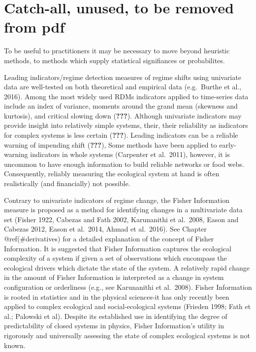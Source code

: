 \documentclass[12pt,twoside,openany]{reedthesis}
\begin{document}
\hypertarget{catch-all-unused-to-be-removed-from-pdf}{%
\chapter*{Catch-all, unused, to be removed from pdf}\label{catch-all-unused-to-be-removed-from-pdf}}

To be useful to practitioners it may be necessary to move beyond heuristic methods, to methods which supply statistical signifiances or probabilites.

Leading indicators/regime detection measures of regime shifts using univariate data are well-tested on both theoretical and empirical data (e.g.~Burthe et al., 2016). Among the most widely used RDMs indicators applied to time-series data include an index of variance, moments around the grand mean (skewness and kurtosis), and critical slowing down ({\textbf{???}}). Although univariate indicators may provide insight into relatively simple systems, their, their reliability as indicators for complex systems is less certain ({\textbf{???}}). Leading indicators can be a reliable warning of impending shift ({\textbf{???}}), Some methods have been applied to early-warning indicators in whole systems (Carpenter et al.~2011), however, it is uncommon to have enough information to build reliable networks or food webs. Consequently, reliably measuring the ecological system at hand is often realistically (and financially) not possible.

Contrary to univariate indicators of regime change, the Fisher Information measure is proposed as a method for identifying changes in a multivariate data set (Fisher 1922, Cabezas and Fath 2002, Karunanithi et al.~2008, Eason and Cabezas 2012, Eason et al.~2014, Ahmad et al.~2016). See Chapter @ref(\#derivatives) for a detailed explanation of the concept of Fisher Information. It is suggested that Fisher Information captures the ecological complexity of a system if given a set of observations which encompass the ecological drivers which dictate the state of the system. A relatively rapid change in the amount of Fisher Information is interpreted as a change in system configuration or orderliness (e.g., see Karunanithi et al.~2008). Fisher Information is rooted in statistics and in the physical sciences-it has only recently been applied to complex ecological and social-ecological systems (Frieden 1998; Fath et al.; Palowski et al). Despite its established use in identifying the degree of predictability of closed systems in physics, Fisher Information's utility in rigorously and universally assessing the state of complex ecological systems is not known.
\end{document}
